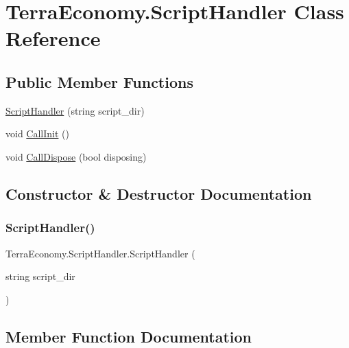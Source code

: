 \hypertarget{class_terra_economy_1_1_script_handler}{}\section{Terra\+Economy.\+Script\+Handler Class Reference}
\label{class_terra_economy_1_1_script_handler}
\subsection*{Public Member Functions}
\begin{DoxyCompactItemize}
\item 
\hyperlink{class_terra_economy_1_1_script_handler_aad814f531bfb11689f0776e8be685aac}{Script\+Handler} (string script\+\_\+dir)
\item 
void \hyperlink{class_terra_economy_1_1_script_handler_aa580a9c066166786d20b502609cffc8c}{Call\+Init} ()
\item 
void \hyperlink{class_terra_economy_1_1_script_handler_a30c759bfc01fa50658893067ab259786}{Call\+Dispose} (bool disposing)
\end{DoxyCompactItemize}


\subsection{Constructor \& Destructor Documentation}
\mbox{\label{class_terra_economy_1_1_script_handler_aad814f531bfb11689f0776e8be685aac}} 
\subsubsection{\texorpdfstring{Script\+Handler()}{ScriptHandler()}}
{\footnotesize\ttfamily Terra\+Economy.\+Script\+Handler.\+Script\+Handler (\begin{DoxyParamCaption}\item[{string}]{script\+\_\+dir }\end{DoxyParamCaption})\hspace{0.3cm}{\ttfamily [inline]}}



\subsection{Member Function Documentation}
\mbox{\label{class_terra_economy_1_1_script_handler_a30c759bfc01fa50658893067ab259786}} 
